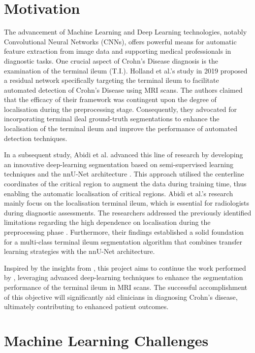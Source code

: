 \section{Motivation}

The advancement of Machine Learning and Deep Learning technologies, notably Convolutional Neural Networks (CNNs), offers powerful means for automatic feature extraction from image data and supporting medical professionals in diagnostic tasks. One crucial aspect of Crohn's Disease diagnosis is the examination of the terminal ileum (T.I.). Holland et al.'s study \cite{holland2019automatic} in 2019 proposed a residual network specifically targeting the terminal ileum to facilitate automated detection of Crohn's Disease using MRI scans. The authors claimed that the efficacy of their framework was contingent upon the degree of localisation during the preprocessing stage. Consequently, they advocated for incorporating terminal ileal ground-truth segmentations to enhance the localisation of the terminal ileum and improve the performance of automated detection techniques.

In a subsequent study, Abidi et al. \cite{Ali2022} advanced this line of research by developing an innovative deep-learning segmentation based on semi-supervised learning techniques and the nnU-Net architecture \cite{isensee2021nnu}. This approach utilised the centerline coordinates of the critical region to augment the data during training time, thus enabling the automatic localisation of critical regions. Abidi et al.'s research mainly focus on the localisation terminal ileum, which is essential for radiologists during diagnostic assessments. The researchers addressed the previously identified limitations regarding the high dependence on localisation during the preprocessing phase \cite{holland2019automatic}. Furthermore, their findings established a solid foundation for a multi-class terminal ileum segmentation algorithm that combines transfer learning strategies with the nnU-Net architecture.

Inspired by the insights from \cite{holland2019automatic, Ali2022}, this project aims to continue the work performed by \cite{Ali2022}, leveraging advanced deep-learning techniques to enhance the segmentation performance of the terminal ileum in MRI scans. The successful accomplishment of this objective will significantly aid clinicians in diagnosing Crohn's disease, ultimately contributing to enhanced patient outcomes.

\section{Machine Learning Challenges}


